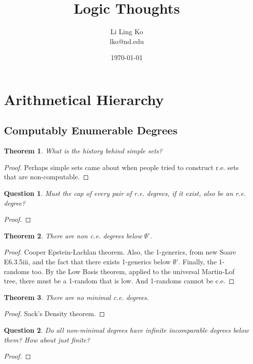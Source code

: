 \documentclass{article}
\newtheorem{theorem}{Theorem}[subsection]
\newtheorem{question}{Question}[subsection]
\begin{document}
\title{Logic Thoughts}
\author{Li Ling Ko\\ lko@nd.edu}
\date{\today}
\maketitle

\section{Arithmetical Hierarchy}
  \subsection{Computably Enumerable Degrees}
    \begin{theorem}
      What is the history behind simple sets?
    \end{theorem}
    \begin{proof}
      Perhaps simple sets came about when people tried to construct
      r.e. sets that are non-computable. 
    \end{proof}

    \begin{question}
      Must the cap of every pair of r.e. degrees, if it exist, also be an
      r.e. degree?
    \end{question}
    \begin{proof}
    \end{proof}

    \begin{theorem}
      There are non c.e. degrees below $\emptyset'$.
    \end{theorem}
    \begin{proof}
      Cooper Epstein-Lachlan theorem. Also, the 1-generics, from new Soare
      E6.3.5iii, and the fact that there exists 1-generics below
      $\emptyset'$. Finally, the 1-randoms too. By the Low Basis theorem,
      applied to the universal Martin-Lof tree, there must be a 1-random
      that is low. And 1-randoms cannot be c.e.
    \end{proof}

    \begin{theorem}
      There are no minimal c.e. degrees.
    \end{theorem}
    \begin{proof}
      Sack's Density theorem.
    \end{proof}

    \begin{question}
      Do all non-minimal degrees have infinite incomparable degrees below
      them? How about just finite?
    \end{question}
    \begin{proof}
    \end{proof}
\end{document}
